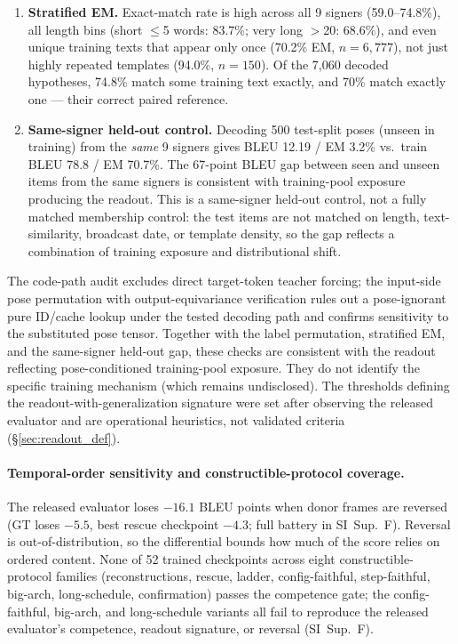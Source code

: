\documentclass[pdflatex,sn-chicago]{sn-jnl}
\begin{document}
\begin{enumerate}
\item \textbf{Stratified EM.} Exact-match rate is high across all 9 signers (59.0--74.8\%), all length bins (short $\leq$5 words: 83.7\%; very long $>$20: 68.6\%), and even unique training texts that appear only once (70.2\% EM, $n{=}6{,}777$), not just highly repeated templates (94.0\%, $n{=}150$). Of the 7{,}060 decoded hypotheses, 74.8\% match some training text exactly, and 70\% match exactly one --- their correct paired reference.
\item \textbf{Same-signer held-out control.} Decoding 500 test-split poses (unseen in training) from the \emph{same} 9 signers gives BLEU 12.19 / EM 3.2\% vs.\ train BLEU 78.8 / EM 70.7\%. The 67-point BLEU gap between seen and unseen items from the same signers is consistent with training-pool exposure producing the readout. This is a same-signer held-out control, not a fully matched membership control: the test items are not matched on length, text-similarity, broadcast date, or template density, so the gap reflects a combination of training exposure and distributional shift.
\end{enumerate}
The code-path audit excludes direct target-token teacher forcing; the input-side pose permutation with output-equivariance verification rules out a pose-ignorant pure ID/cache lookup under the tested decoding path and confirms sensitivity to the substituted pose tensor. Together with the label permutation, stratified EM, and the same-signer held-out gap, these checks are consistent with the readout reflecting pose-conditioned training-pool exposure. They do not identify the specific training mechanism (which remains undisclosed). The thresholds defining the readout-with-generalization signature were set after observing the released evaluator and are operational heuristics, not validated criteria (\S\ref{sec:readout_def}).

\paragraph{Temporal-order sensitivity and constructible-protocol coverage.}
The released evaluator loses $-16.1$ BLEU points when donor frames are reversed (GT loses $-5.5$, best rescue checkpoint $-4.3$; full battery in SI~Sup.~F). Reversal is out-of-distribution, so the differential bounds how much of the score relies on ordered content. None of 52 trained checkpoints across eight constructible-protocol families (reconstructions, rescue, ladder, config-faithful, step-faithful, big-arch, long-schedule, confirmation) passes the competence gate; the config-faithful, big-arch, and long-schedule variants all fail to reproduce the released evaluator's competence, readout signature, or reversal (SI~Sup.~F).
\end{document}
